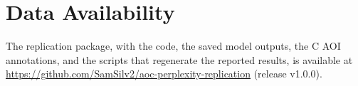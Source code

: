 \documentclass[sigconf,nonacm]{acmart}
\begin{document}
\section*{Data Availability}
The replication package, with the code, the saved model outputs, the C AOI annotations, and the scripts that regenerate the reported results, is available at \url{https://github.com/SamSilv2/aoc-perplexity-replication} (release v1.0.0).




\onecolumn

\end{document}
